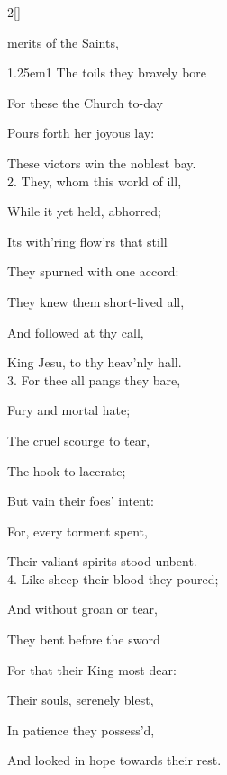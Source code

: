 \begin{paracol}{2}[]
\sloppy

\firstEvensong


\firstEvensongHymn\label{MartyrsEvensong}

 merits of the Saints,



\begin{hangparas}{1.25em}{1}
The toils they bravely bore

For these the Church to-day

Pours forth her joyous lay:

These victors win the noblest bay.\\

2. They, whom this world of ill,

While it yet held, abhorred;

Its with'ring flow'rs that still 

They spurned with one accord:

They knew them short-lived all,

And followed at thy call,

King Jesu, to thy heav'nly hall.\\

3. For thee all pangs they bare,

Fury and mortal hate;

The cruel scourge to tear,

The hook to lacerate;

But vain their foes' intent:

For, every torment spent,

Their valiant spirits stood unbent.\\

4. Like sheep their blood they poured;

And without groan or tear,

They bent before the sword

For that their King most dear:

Their souls, serenely blest,

In patience they possess'd,

And looked in hope towards their rest.\\


\end{hangparas}
\end{paracol}

